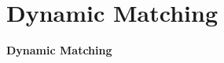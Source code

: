 \documentclass[10pt,titlepage,english,presentation]{beamer}
\newcommand{\emphcolor}{blue}
\renewcommand{\emph}[1]{\textcolor{\emphcolor}{#1}}
\begin{document}
%
%
%
%

\section{Dynamic Matching}

\begin{frame}
\centering
\vfill\Huge\textbf{\textcolor{HUBblue}{Dynamic Matching}}\vfill
\end{frame}
\end{document}
